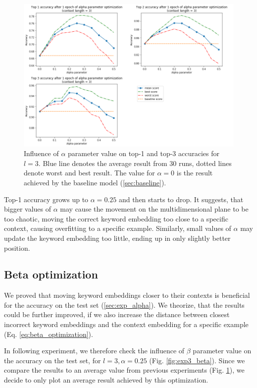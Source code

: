 \documentclass{llncs}
\begin{document}
\begin{figure}
    \centering
    \caption{Influence of \(\alpha\) parameter value on top-1 and top-3 accuracies for \(l=3\). Blue line denotes the average result from 30 runs, dotted lines denote worst and best result. The value for \(\alpha=0\) is the result achieved by the baseline model (\ref{sec:baseline}).}
    \label{fig:exp2_alpha}
    \includegraphics[scale=0.7]{res/exp2_alpha_top_acc.png}
\end{figure}

Top-1 accuracy grows up to \(\alpha=0.25\) and then starts to drop.
It suggests, that bigger values of \(\alpha\) may cause the movement on the multidimensional plane to be too chaotic, moving the correct keyword embedding too close to a specific context, causing overfitting to a specific example.
Similarly, small values of \(\alpha\) may update the keyword embedding too little, ending up in only slightly better position.

\subsection{Beta optimization}
We proved that moving keyword embeddings closer to their contexts is beneficial for the accuracy on the test set (\ref{sec:exp_alpha}).
We theorize, that the results could be further improved, if we also increase the distance between closest incorrect keyword embeddings and the context embedding for a specific example (Eq. \ref{eq:beta_optimization}).

In following experiment, we therefore check the influence of \(\beta\) parameter value on the accuracy on the test set, for \(l=3, \alpha=0.25\) (Fig. \ref{fig:exp3_beta}).
Since we compare the results to an average value from previous experiments (Fig. \ref{fig:exp2_alpha}), we decide to only plot an average result achieved by this optimization.
\end{document}
